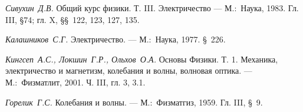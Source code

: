 \begin{lab:literature}
\item
\textit{Сивухин~Д.В.} Общий курс физики. Т. III. Электричество --- М.:~Наука,
1983. Гл. III, \S 74; гл. X, \S\S~122, 123, 127, 135.

\item
\textit{Калашников~С.Г.} Электричество. --- М.:~Наука, 1977. \S~226.

\item
\textit{Кингсеп~А.С., Локшин~Г.Р., Ольхов~О.А.} Основы Физики. Т. 1. Механика,
электричество и магнетизм, колебания и волны, волновая оптика. ---
М.:~Физматлит, 2001. Ч. III, гл. 3, 3.1.

\item
\textit{Горелик~Г.С.} Колебания и волны. --- М.:~Физматгиз, 1959. Гл. III, \S~9.
\end{lab:literature}
